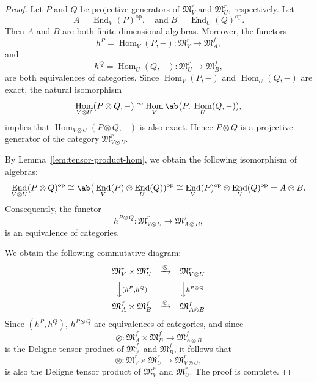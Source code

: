\documentclass[12pt, english]{article}
\numberwithin{equation}{section}
\DeclareMathOperator{\End}{End}
\DeclareMathOperator{\Hom}{Hom}
\DeclareMathOperator{\opp}{op}
\theoremstyle{plain}
\theoremstyle{definition}
\theoremstyle{remark}
\begin{document}
	\begin{proof}
		Let $P$ and $Q$ be projective generators of $\mathfrak{M}^r_V$ and $\mathfrak{M}^r_U$, respectively.
		Let
		\[
		A = \End_V(P)^{\opp}, \quad \text{and} \; B = \End_U(Q)^{\opp}.
		\]
		Then $A$ and $B$ are both finite-dimensional algebras.
		Moreover, the functors
		\[
		h^P = \Hom_V(P, -) \colon \mathfrak{M}^r_V \longrightarrow \mathfrak{M}^f_A,
		\]
		and
		\[
		h^Q = \Hom_U(Q, -) \colon \mathfrak{M}^r_U \longrightarrow \mathfrak{M}^f_B,
		\]
		are both equivalences of categories.
		Since $\Hom_V(P, -)$ and $\Hom_U(Q, -)$ are exact, the natural isomorphism
		\[
		\Hom_{V \otimes U}(P \otimes Q, -) \cong \Hom_V \ab\big(P, \; \Hom_U(Q, -)),
		\]
		implies that $\Hom_{V\otimes U}(P\otimes Q, -)$ is also exact.
		Hence $P\otimes Q$ is a projective generator of the category  $ \mathfrak{M}^r_{V \otimes U}$.
		
		By Lemma~\ref{lem:tensor-product-hom}, we obtain the following isomorphism of algebras:
		\[
		\End_{V \otimes U}(P \otimes Q)^{\opp}
		\cong \ab\big(\End_V(P) \otimes \End_U(Q))^{\opp}
		\cong \End_V(P)^{\opp} \otimes \End_U(Q)^{\opp}
		= A \otimes B.
		\]
		Consequently, the functor
		\[
		h^{P\otimes Q} \colon \mathfrak{M}^r_{V \otimes U} \to \mathfrak{M}^f_{A \otimes B},
		\]
		is an equivalence of categories.
		
		We obtain the following commutative diagram:
		\[
		\begin{array}{ccc}
			\mathfrak{M}^r_V \times \mathfrak{M}^r_U
			& \xrightarrow{\otimes}
			& \mathfrak{M}^r_{V \otimes U} \\[6pt]
			\Big\downarrow{\scriptstyle (h^P, h^Q)}
			& &
			\Big\downarrow{\scriptstyle h^{P \otimes Q}} \\[6pt]
			\mathfrak{M}^f_A \times \mathfrak{M}^f_B
			& \xrightarrow{\otimes}
			& \mathfrak{M}^f_{A \otimes B}
		\end{array}
		\]
		Since $(h^P, h^Q)$, $h^{P \otimes Q}$ are equivalences of categories, and since
		\[
		\otimes \colon \mathfrak{M}^f_A \times \mathfrak{M}^f_B \longrightarrow \mathfrak{M}^f_{A \otimes B}
		\]
		is the Deligne tensor product of $ \mathfrak{M}^f_A $ and $\mathfrak{M}^f_B $,
		it follows that
		\[
		\otimes \colon \mathfrak{M}^r_V \times \mathfrak{M}^r_U \longrightarrow \mathfrak{M}^r_{V \otimes U},
		\]
		is also the Deligne tensor product of $ \mathfrak{M}^r_V $ and $\mathfrak{M}^r_U $.
		The proof is complete.
		
	\end{proof}
	
\end{document}
